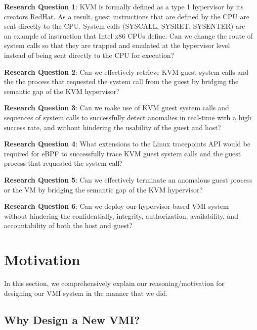 \documentclass{report}
\begin{document}
\begin{spacing}{1.5}
{\large
\noindent \textbf{Research Question 1}: KVM is formally defined as a type 1 hypervisor by its creators RedHat. As a result, guest instructions that are defined by the CPU are sent directly to the CPU. System calls (SYSCALL, SYSRET, SYSENTER) are an example of instruction that Intel x86 CPUs define. Can we change the route of system calls so that they are trapped and emulated at the hypervisor level instead of being sent directly to the CPU for execution?
\newline
}

{\large
\noindent \textbf{Research Question 2}: Can we effectively retrieve KVM guest system calls and the the process that requested the system call from the guest by bridging the semantic gap of the KVM hypervisor?
\newline
}


{\large
\noindent \textbf{Research Question 3}: Can we make use of KVM guest system calls and sequences of system calls to successfully detect anomalies in real-time with a high success rate, and without hindering the usability of the guest and host?
\newline
}


{\large
\noindent \textbf{Research Question 4}: What extensions to the Linux tracepoints API would be required for eBPF to successfully trace KVM guest system calls and the guest process that requested the system call?
\newline
}

{\large
\noindent \textbf{Research Question 5}: Can we effectively terminate an anomalous guest process or the VM by bridging the semantic gap of the KVM hypervisor?
\newline
}

{\large
\noindent \textbf{Research Question 6}: Can we deploy our hypervisor-based VMI system without hindering the confidentially, integrity, authorization, availability, and accountability of both the host and guest?  
\newline
}


\section{Motivation}

{\large 
In this section, we comprehensively explain our reasoning/motivation for designing our VMI system in the manner that we did.
}
 

\subsection{Why Design a New VMI?}


\end{spacing}
\end{document}
